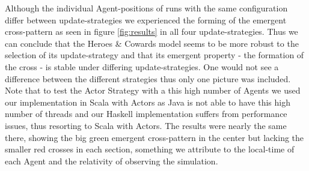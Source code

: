 Although the individual Agent-positions of runs with the same configuration differ between update-strategies we experienced the forming of the emergent cross-pattern as seen in figure \ref{fig:results} in all four update-strategies. Thus we can conclude that the Heroes \& Cowards model seems to be more robust to the selection of its update-strategy and that its emergent property - the formation of the cross - is stable under differing update-strategies. One would not see a difference between the different strategies thus only one picture was included. Note that to test the Actor Strategy with a this high number of Agents we used our implementation in Scala with Actors as Java is not able to have this high number of threads and our Haskell implementation suffers from performance issues, thus resorting to Scala with Actors. The results were nearly the same there, showing the big green emergent cross-pattern in the center but lacking the smaller red crosses in each section, something we attribute to the local-time of each Agent and the relativity of observing the simulation.